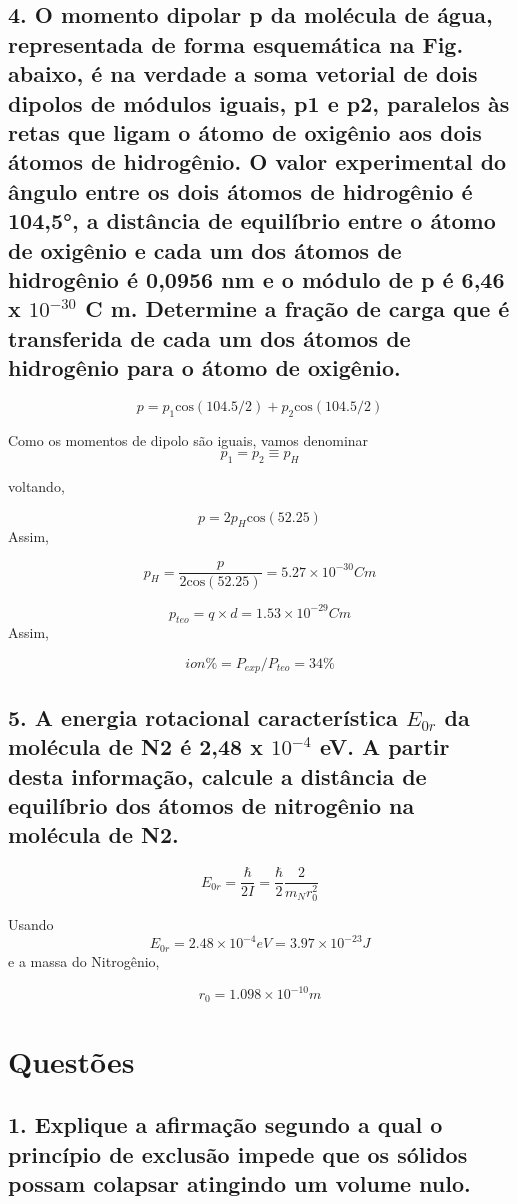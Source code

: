 \documentclass{article}
\begin{document}
\subsection{4. O momento dipolar p da molécula de água, representada de forma esquemática na Fig.  abaixo, é na verdade a soma vetorial de dois dipolos de módulos iguais, p1 e p2,  paralelos às retas que ligam o átomo de oxigênio aos dois átomos de hidrogênio. O  valor experimental do ângulo entre os dois átomos de hidrogênio é 104,5°, a distância  de equilíbrio entre o átomo de oxigênio e cada um dos átomos de hidrogênio é  0,0956 nm e o módulo de p é 6,46 x $10^{-30}$ C m. Determine a fração de carga que é  transferida de cada um dos átomos de hidrogênio para o átomo de oxigênio.} %

\[p = p_1 \text{cos}(104.5/2) +p_2 \text{cos}(104.5/2)\]
    
Como os momentos de dipolo são iguais, vamos denominar
\[p_1=p_2 \equiv p_H\]

voltando,

\[p = 2p_H \text{cos}(52.25)\]
Assim,

\[p_H = \frac{p}{2\text{cos}(52.25)} = 5.27 \times 10^{-30} C m\]

\[p_{teo}  = q \times d = 1.53 \times 10^{-29} C m\]
Assim,

\[ion \% = P_{exp}/P_{teo} = 34\%\]

\subsection{5. A energia rotacional característica $E_{0 r}$ da molécula de N2 é 2,48 x $10^{-4}$ eV. A partir desta  informação, calcule a distância de equilíbrio dos átomos de nitrogênio na molécula de  N2.}  %

\[E_{0 r} = \frac{\hbar}{2I}= \frac{\hbar}{2}\frac{2}{m_N r_0 ^2}\]

Usando \[E_{0 r} = 2.48 \times 10^{-4} eV= 3.97 \times 10^{-23} J\] e a massa do Nitrogênio,


\[r_0 = 1.098 \times 10^{-10}m\]

\pagebreak

\section{Questões} 

\subsection{1. Explique a afirmação segundo a qual o princípio de exclusão impede que os sólidos  possam colapsar atingindo um volume nulo.}
\end{document}

